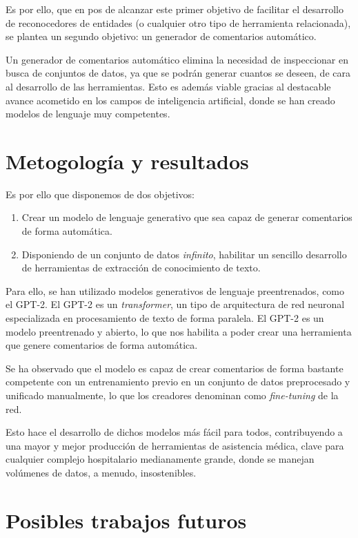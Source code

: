 Es por ello, que en pos de alcanzar este primer objetivo de facilitar el desarrollo de reconocedores de entidades (o cualquier otro tipo de herramienta relacionada), se plantea un segundo objetivo: un generador de comentarios automático.

Un generador de comentarios automático elimina la necesidad de inspeccionar en busca de conjuntos de datos, ya que se podrán generar cuantos se deseen, de cara al desarrollo de las herramientas. Esto es además viable gracias al destacable avance acometido en los campos de inteligencia artificial, donde se han creado modelos de lenguaje muy competentes.


\section{Metogología y resultados}
Es por ello que disponemos de dos objetivos: 
\begin{enumerate}
	\item Crear un modelo de lenguaje generativo que sea capaz de generar comentarios de forma automática.
	\item Disponiendo de un conjunto de datos \textit{infinito}, habilitar un sencillo desarrollo de herramientas de extracción de conocimiento de texto.
\end{enumerate}

Para ello, se han utilizado modelos generativos de lenguaje preentrenados, como el GPT-2. El GPT-2 es un \textit{transformer}, un tipo de arquitectura de red neuronal especializada en procesamiento de texto de forma paralela. El GPT-2 es un modelo preentrenado y abierto, lo que nos habilita a poder crear una herramienta que genere comentarios de forma automática.

Se ha observado que el modelo es capaz de crear comentarios de forma bastante competente con un entrenamiento previo en un conjunto de datos preprocesado y unificado manualmente, lo que los creadores denominan como \textit{fine-tuning} de la red. 

Esto hace el desarrollo de dichos modelos más fácil para todos, contribuyendo a una mayor y mejor producción de herramientas de asistencia médica, clave para cualquier complejo hospitalario medianamente grande, donde se manejan volúmenes de datos, a menudo, insostenibles.

\section{Posibles trabajos futuros}

